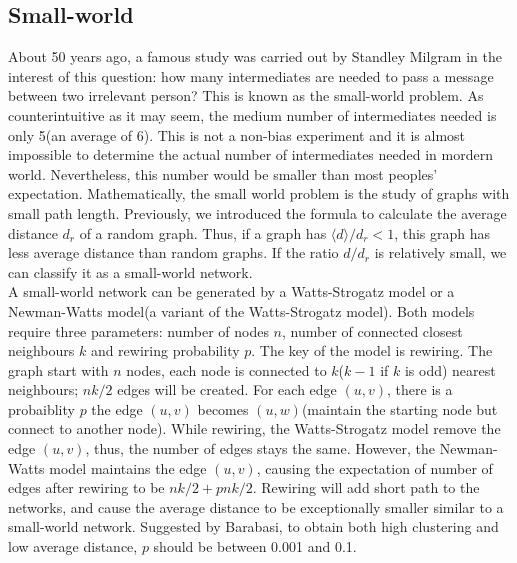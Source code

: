 \documentclass[12pt]{article}
\begin{document}
\subsection{Small-world}
About 50 years ago, a famous study was carried out by Standley Milgram\cite{milgram1967small} in the interest of this question: how many intermediates are needed to pass a message between two irrelevant person? This is known as the small-world problem. As counterintuitive as it may seem, the medium number of intermediates needed is only 5(an average of 6). This is not a non-bias experiment and it is almost impossible to determine the actual number of intermediates needed in mordern world. Nevertheless, this number would be smaller than most peoples' expectation. Mathematically, the small world problem is the study of graphs with small path length. Previously, we introduced the formula to calculate the average distance $d_r$ of a random graph. Thus, if a graph has $\langle d\rangle /d_r <1$, this graph has less average distance than random graphs. If the ratio $d/d_r$ is relatively small, we can classify it as a small-world network.\\
\noindent
A small-world network can be generated by a Watts-Strogatz model\cite{wsmodel} or a Newman-Watts model(a variant of the Watts-Strogatz model)\cite{nwmodel}. Both models require three parameters: number of nodes $n$, number of connected closest neighbours $k$ and rewiring probability $p$. The key of the model is rewiring. The graph start with $n$ nodes, each node is connected to $k$($k-1$ if $k$ is odd) nearest neighbours; $nk/2$ edges will be created. For each edge $(u,v)$, there is a probaiblity $p$ the edge $(u,v)$ becomes $(u,w)$(maintain the starting node but connect to another node). While rewiring, the Watts-Strogatz model remove the edge $(u,v)$, thus, the number of edges stays the same. However, the Newman-Watts model maintains the edge $(u,v)$, causing the expectation of number of edges after rewiring to be $nk/2+pnk/2$. Rewiring will add short path to the networks, and cause the average distance to be exceptionally smaller similar to a small-world network. Suggested by Barabasi\cite{barabási2016network}, to obtain both high clustering and low average distance, $p$ should be between 0.001 and 0.1.\\
\end{document}
